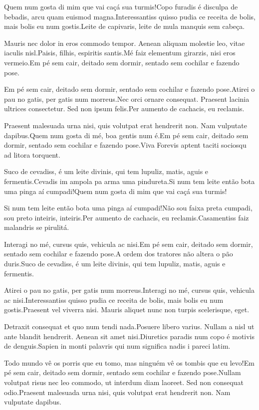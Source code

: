 \documentclass[twoside, a4paper, 12pt]{article}
\begin{document}
  Quem num gosta di mim que vai caçá sua turmis!Copo furadis é disculpa de bebadis, arcu quam euismod magna.Interessantiss quisso pudia ce receita de bolis, mais bolis eu num gostis.Leite de capivaris, leite de mula manquis sem cabeça.
  
  Mauris nec dolor in eros commodo tempor. Aenean aliquam molestie leo, vitae iaculis nisl.Paisis, filhis, espiritis santis.Mé faiz elementum girarzis, nisi eros vermeio.Em pé sem cair, deitado sem dormir, sentado sem cochilar e fazendo pose.
  
  Em pé sem cair, deitado sem dormir, sentado sem cochilar e fazendo pose.Atirei o pau no gatis, per gatis num morreus.Nec orci ornare consequat. Praesent lacinia ultrices consectetur. Sed non ipsum felis.Per aumento de cachacis, eu reclamis.
  
  Praesent malesuada urna nisi, quis volutpat erat hendrerit non. Nam vulputate dapibus.Quem num gosta di mé, boa gentis num é.Em pé sem cair, deitado sem dormir, sentado sem cochilar e fazendo pose.Viva Forevis aptent taciti sociosqu ad litora torquent.
  
  Suco de cevadiss, é um leite divinis, qui tem lupuliz, matis, aguis e fermentis.Cevadis im ampola pa arma uma pindureta.Si num tem leite então bota uma pinga aí cumpadi!Quem num gosta di mim que vai caçá sua turmis!
  
  Si num tem leite então bota uma pinga aí cumpadi!Não sou faixa preta cumpadi, sou preto inteiris, inteiris.Per aumento de cachacis, eu reclamis.Casamentiss faiz malandris se pirulitá.
  
  Interagi no mé, cursus quis, vehicula ac nisi.Em pé sem cair, deitado sem dormir, sentado sem cochilar e fazendo pose.A ordem dos tratores não altera o pão duris.Suco de cevadiss, é um leite divinis, qui tem lupuliz, matis, aguis e fermentis.
  
  Atirei o pau no gatis, per gatis num morreus.Interagi no mé, cursus quis, vehicula ac nisi.Interessantiss quisso pudia ce receita de bolis, mais bolis eu num gostis.Praesent vel viverra nisi. Mauris aliquet nunc non turpis scelerisque, eget.
  
  Detraxit consequat et quo num tendi nada.Posuere libero varius. Nullam a nisl ut ante blandit hendrerit. Aenean sit amet nisi.Diuretics paradis num copo é motivis de denguis.Sapien in monti palavris qui num significa nadis i pareci latim.
  
  Todo mundo vê os porris que eu tomo, mas ninguém vê os tombis que eu levo!Em pé sem cair, deitado sem dormir, sentado sem cochilar e fazendo pose.Nullam volutpat risus nec leo commodo, ut interdum diam laoreet. Sed non consequat odio.Praesent malesuada urna nisi, quis volutpat erat hendrerit non. Nam vulputate dapibus.
  
\end{document}
